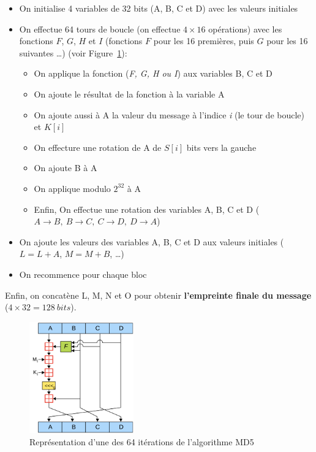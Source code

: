 \documentclass[12pt, a4paper]{article}
\begin{document}
\begin{itemize}
    \item On initialise 4 variables de 32 bits (A, B, C et D) avec les valeurs initiales
    \item On effectue 64 tours de boucle (on effectue $4 \times 16$ opérations) avec les fonctions $F$, $G$, $H$ et $I$
    (fonctions $F$ pour les 16 premières, puis $G$ pour les 16 suivantes \ldots) (voir Figure~\ref{md5_algo}):
    \begin{itemize}[label={\textbullet}]
        \item On applique la fonction (\textit{F, G, H ou I}) aux variables B, C et D
        \item On ajoute le résultat de la fonction à la variable A
        \item On ajoute aussi à A la valeur du message à l'indice \textit{i} (le tour de boucle) et $K[i]$
        \item On effecture une rotation de A de $S[i]$ bits vers la gauche
        \item On ajoute B à A
        \item On applique modulo $2^{32}$ à A
        \item Enfin, On effectue une rotation des variables A, B, C et D ($A \rightarrow B, \ B \rightarrow C, \ C \rightarrow D, \ D \rightarrow A$)
    \end{itemize}
    \item On ajoute les valeurs des variables A, B, C et D aux valeurs initiales ($L = L + A$, $M = M + B$, \ldots)
    \item On recommence pour chaque bloc
\end{itemize}
\bigskip
Enfin, on concatène L, M, N et O pour obtenir \textbf{l'empreinte finale du message} ($4 \times 32 = 128 \ bits$).
\bigskip
\begin{figure}[ht]
    \centering
    \includegraphics[width=0.4\textwidth]{../annexes/md5_algo.png}
    \caption{Représentation d'une des 64 itérations de l'algorithme MD5}\label{md5_algo}
\end{figure}
\end{document}
